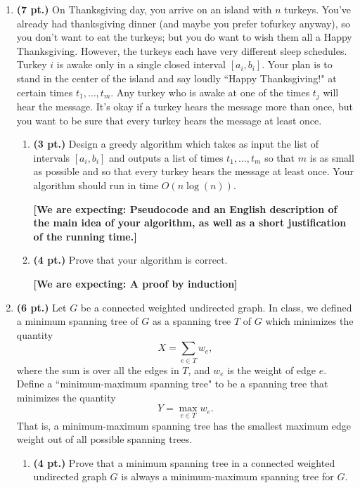 \documentclass{article}
\newcommand{\expecting}[1]{\noindent\textbf{[We are expecting: #1]}}
\newcommand{\pts}[1]{\textbf{(#1 pt.)}}
\begin{document}
\begin{enumerate}
\begin{enumerate}
\end{enumerate}


\newpage
\item \pts{7}
On Thanksgiving day, you arrive on an island with $n$ turkeys.  You've already had thanksgiving dinner
(and maybe you prefer tofurkey anyway),
so you don't want to eat the turkeys; but you do want to wish them all a Happy Thanksgiving.  However, the turkeys each have very different sleep schedules.  Turkey $i$ is awake only in a single closed interval $[a_i,b_i]$.  Your plan is to stand in the center of the island and say loudly ``Happy Thanksgiving!" at certain times $t_1,\ldots, t_m$.  Any turkey who is awake at one of the times $t_j$ will hear the message.  It's okay if a turkey hears the message more than once, but you want to be sure that every turkey hears the message at least once.

\begin{enumerate}
\item \pts{3} Design a greedy algorithm which takes as input the list of intervals $[a_i,b_i]$ and outputs a list of times $t_1,\ldots,t_m$ so that $m$ is as small as possible and so that every turkey hears the message at least once.  Your algorithm should run in time $O(n\log(n))$.  

\expecting{Pseudocode and an English description of the main idea of your algorithm, as well as a short justification of the running time.}



\item \pts{4} Prove that your algorithm is correct.

\expecting{A proof by induction}


\end{enumerate} 

\vspace{1cm}
\item \pts{6}
Let $G$ be a connected weighted undirected graph.
In class, we defined a minimum spanning tree of $G$ as a spanning tree $T$ of $G$ which minimizes the quantity
\[ X = \sum_{e \in T} w_e, \]
where the sum is over all the edges in $T$, and $w_e$ is the weight of edge $e$.
Define a  ``minimum-maximum spanning tree" to be a spanning tree that minimizes the quantity
\[ Y = \max_{e \in T} w_e. \]
That is, a minimum-maximum spanning tree has the smallest maximum edge weight out of all possible spanning trees.
\begin{enumerate}

	\item \pts{4} Prove that a minimum spanning tree in a connected weighted undirected graph $G$ is always a minimum-maximum spanning tree for $G$.


\end{enumerate}
\end{enumerate}
\end{document}
